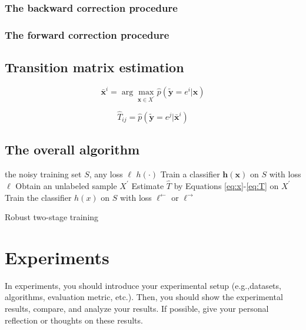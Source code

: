\documentclass{article} %
\begin{document}
\subsubsection{The backward correction procedure}
\subsubsection{The forward correction procedure}

\subsection{Transition matrix estimation}
\begin{equation}
\bar{\boldsymbol{x}}^i = \arg\max_{\boldsymbol{x}\in X^\prime} \hat{p}\left(\tilde{\boldsymbol{y}}=e^i|\boldsymbol{x}\right)
\label{eq:x}
\end{equation}

\begin{equation}
\hat{T}_{ij} = \hat{p}\left(\tilde{\boldsymbol{y}}=e^j|\bar{\boldsymbol{x}}^i\right)
\label{eq:T}
\end{equation}

\subsection{The overall algorithm}
\begin{algorithm}
\begin{algorithmic}
\REQUIRE the noisy training set $S$, any loss $\ell$
\ENSURE $h\left(\cdot\right)$
  \STATE Train a classifier $\boldsymbol{h}\left(\boldsymbol{x}\right)$ on $S$ with loss $\ell$
  \STATE Obtain an unlabeled sample $X^\prime$
  \STATE Estimate $\hat{T}$ by Equations \eqref{eq:x}-\eqref{eq:T} on $X^\prime$
\ENDIF
\STATE Train the classifier $h\left(x\right)$ on $S$ with loss $\ell^\leftarrow$ or $\ell^\rightarrow$
\end{algorithmic}
\caption{Robust two-stage training \label{alg:training}}
\end{algorithm}

\section{Experiments}
In experiments, you should introduce your experimental setup (e.g.,datasets, algorithms, evaluation metric, etc.). Then, you should show the experimental results, compare, and analyze your results. If possible, give your personal reflection or thoughts on these results.
\end{document}
